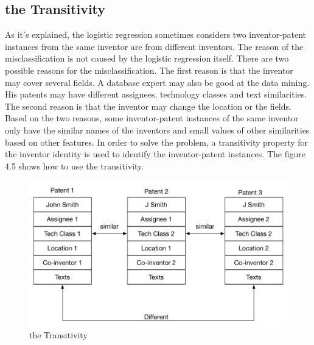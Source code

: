 \subsection{the Transitivity}
As it's explained, the logistic regression sometimes considers two inventor-patent instances from the same inventor are from different inventors. The reason of the misclassification is not caused by the logistic regression itself. There are two possible reasons for the misclassification. The first reason is that the inventor may cover several fields. A database expert may also be good at the data mining. His patents may have different assignees, technology classes and text similarities. The second reason is that the inventor may change the location or the fields. Based on the two reasons, some inventor-patent instances of the same inventor only have the similar names of the inventors and small values of other similarities based on other features. In order to solve the problem, a transitivity property for the inventor identity is used to identify the inventor-patent instances. The figure 4.5 shows how to use the transitivity. 
\begin{figure}
\begin{center}
\includegraphics[scale=0.7]{Transitivity.pdf}
\caption{the Transitivity}
\end{center}
\end{figure}
